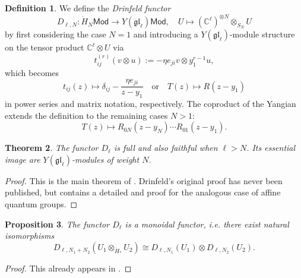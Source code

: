 \documentclass[11pt]{report}
\newtheorem{theorem}{Theorem}[section]
\newtheorem{prop}[theorem]{Proposition}
\theoremstyle{definition}
\newtheorem{definition}[theorem]{Definition}
\theoremstyle{remark}
\theoremstyle{remark}
\newcommand{\C}{\mathbb{C}}
\begin{document}
\begin{definition}
We define the \emph{Drinfeld functor}
\begin{equation*}
D_{\ell,N}: \dot H_N\mathsf{Mod} \to Y(\mathfrak{gl}_\ell)\mathsf{Mod}, \quad U \mapsto (\C^\ell)^{\otimes N} \otimes_{S_N} U
\end{equation*}
by first considering the case $N=1$ and introducing a $Y(\mathfrak{gl}_\ell)$-module structure on the tensor product $\C^\ell \otimes U$ via
\begin{equation*}
t_{ij}^{(r)}(v \otimes u) := -\eta e_{ji} v \otimes y_1^{r-1} u,
\end{equation*}
which becomes
\begin{equation*}
t_{ij}(z) \mapsto \delta_{ij} - \frac{\eta e_{ji}}{z-y_1} \quad \text{or} \quad T(z) \mapsto R(z-y_1)
\end{equation*}
in power series and matrix notation, respectively. The coproduct of the Yangian extends the definition to the remaining cases $N > 1$:
\begin{equation*}
T(z) \mapsto R_{0N}(z-y_N) \cdots R_{01}(z-y_1).
\end{equation*}
\end{definition}

\begin{theorem}
The functor $D_\ell$ is full and also faithful when $\ell > N$. Its essential image are $Y(\mathfrak{gl}_\ell)$-modules of weight $N$.
\end{theorem}

\begin{proof}
This is the main theorem of \cite{article:drinfeld:1986}. Drinfeld's original proof has never been published, but \cite{article:chari:1995} contains a detailed and proof for the analogous case of affine quantum groups.
\end{proof}

\begin{prop}
The functor $D_\ell$ is a monoidal functor, \emph{i.e.} there exist natural isomorphisms
\begin{equation*}
D_{\ell,N_1+N_2}(U_1 \otimes_{\dot H_*} U_2) \cong D_{\ell,N_1}(U_1) \otimes D_{\ell,N_2}(U_2).
\end{equation*}
\end{prop}

\begin{proof}
This already appears in \cite{article:drinfeld:1986}.
\end{proof}
\end{document}
